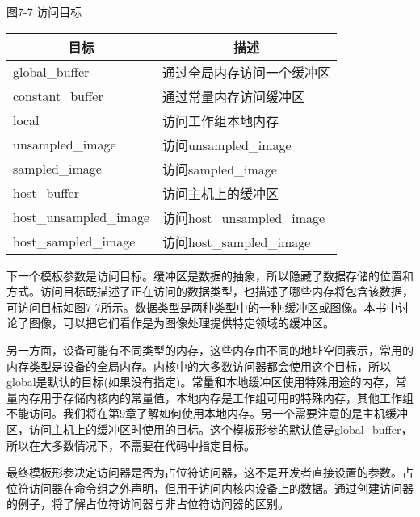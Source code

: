 \hspace*{\fill} \par %
图7-7 访问目标
\begin{table}[H]
	\begin{tabular}{|l|l|}
		\hline
		\multicolumn{1}{|c|}{目标} & \multicolumn{1}{c|}{描述}        \\ \hline
		global\_buffer               & 通过全局内存访问一个缓冲区   \\ \hline
		constant\_buffer             & 通过常量内存访问缓冲区 \\ \hline
		local                        & 访问工作组本地内存          \\ \hline
		unsampled\_image             & 访问unsampled\_image              \\ \hline
		sampled\_image               & 访问sampled\_image                 \\ \hline
		host\_buffer                 & 访问主机上的缓冲区             \\ \hline
		host\_unsampled\_image       & 访问host\_unsampled\_image  \\ \hline
		host\_sampled\_image         & 访问host\_sampled\_image      \\ \hline
	\end{tabular}
\end{table}

下一个模板参数是访问目标。缓冲区是数据的抽象，所以隐藏了数据存储的位置和方式。访问目标既描述了正在访问的数据类型，也描述了哪些内存将包含该数据，可访问目标如图7-7所示。数据类型是两种类型中的一种:缓冲区或图像。本书中讨论了图像，可以把它们看作是为图像处理提供特定领域的缓冲区。\par

另一方面，设备可能有不同类型的内存，这些内存由不同的地址空间表示，常用的内存类型是设备的全局内存。内核中的大多数访问器都会使用这个目标，所以global是默认的目标(如果没有指定)。常量和本地缓冲区使用特殊用途的内存，常量内存用于存储内核内的常量值，本地内存是工作组可用的特殊内存，其他工作组不能访问。我们将在第9章了解如何使用本地内存。另一个需要注意的是主机缓冲区，访问主机上的缓冲区时使用的目标。这个模板形参的默认值是global\_buffer，所以在大多数情况下，不需要在代码中指定目标。\par

最终模板形参决定访问器是否为占位符访问器，这不是开发者直接设置的参数。占位符访问器在命令组之外声明，但用于访问内核内设备上的数据。通过创建访问器的例子，将了解占位符访问器与非占位符访问器的区别。\par

